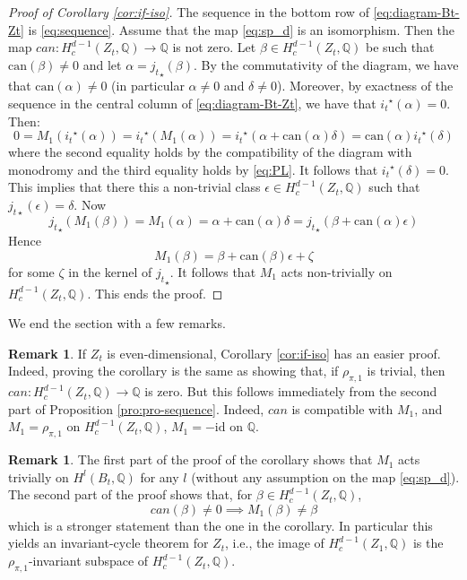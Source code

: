 \documentclass[11pt, reqno]{amsart}
\theoremstyle{plain}
\theoremstyle{definition}
\newtheorem{rem}[thm]{Remark}
\newcommand{\QQ}{\mathbb{Q}}
\begin{document}
\begin{proof}[Proof of Corollary \ref{cor:if-iso}]
The sequence in the bottom row of \eqref{eq:diagram-Bt-Zt} is \eqref{eq:sequence}. Assume that the map \eqref{eq:sp_d} is an isomorphism. Then
the map ${can} \colon H^{d-1}_c(Z_t, \QQ) \to \QQ $ is not zero. Let $\beta \in H^{d-1}_c(Z_t, \QQ)$ be such that $\mathrm{can}(\beta) \neq 0$ and let $\alpha={j_{t}}_{\star} (\beta)$.  By the commutativity of the diagram, we have that $\mathrm{can}(\alpha) \neq 0$ (in particular $\alpha \neq 0$ and $\delta \neq 0$). Moreover, by exactness of the sequence in the central column of \eqref{eq:diagram-Bt-Zt}, we have that ${i_{t}}^{\star} (\alpha)=0$.
Then: 
\[ 0= M_1({i_{t}}^{\star}  (\alpha))= {i_{t}}^{\star} (M_1(\alpha))={i_{t}}^{\star}  \left(\alpha + \mathrm{can}(\alpha) \delta\right)
=\mathrm{can}(\alpha) {i_{t}}^{\star} (\delta) 
\]
where the second equality holds by the compatibility of the diagram with monodromy and the third equality holds by \eqref{eq:PL}. It follows that ${i_{t}}^{\star}(\delta)=0$. This implies that there this a non-trivial class $\epsilon \in H^{d-1}_c(Z_t, \QQ)$ such that $j_{t \star}(\epsilon)=\delta$. Now
\[ {j_{t}}_{\star}(M_1(\beta))=M_1(\alpha)=\alpha + \mathrm{can}(\alpha)\delta= {j_{t}}_{\star}(\beta+\mathrm{can}(\alpha)\epsilon) \] 
Hence
\begin{equation}
\label{eq:Z-PL}
M_1(\beta)=\beta + \mathrm{can}(\beta) \epsilon +\zeta
\end{equation} for some $\zeta$ in the kernel of ${j_{t}}_{\star}$. It follows that $M_1$ acts non-trivially on $H^{d-1}_c(Z_t, \QQ)$. This ends the proof.
\end{proof}

We end the section with a few remarks.

\begin{rem}
\label{rem:even-proof}	
If $Z_t$ is even-dimensional, Corollary \ref{cor:if-iso} has an easier proof. Indeed,
proving the corollary is the same as showing that, if $\rho_{\pi,1}$ is trivial, then $can \colon H^{d-1}_c(Z_t, \QQ) \to \QQ$ is zero. But this follows immediately from the second part of Proposition \ref{pro:pro-sequence}. Indeed, $can$ is compatible with $M_1$, and $M_1=\rho_{\pi,1}$ on  $H^{d-1}_c(Z_t, \QQ)$,  $M_1 =- \mathrm{id}$ on $\QQ$.
\end{rem}

\begin{rem}
\label{rem:consequences}	
The first part of the proof of the corollary shows that $M_1$ acts trivially on $H^{l}(B_t, \QQ)$ for any $l$ (without any assumption on the map \eqref{eq:sp_d}). 
The second part of the proof shows that, for $\beta \in H^{d-1}_c(Z_t, \QQ)$, 
\[can(\beta)\neq 0 \implies M_1(\beta) \neq \beta\]
which is a stronger statement than the one in the corollary. 
In particular this yields an invariant-cycle theorem for $Z_t$, i.e., the image of  $H^{d-1}_c(Z_1, \QQ)$ is the $\rho_{\pi,1}$-invariant subspace of
$H^{d-1}_c(Z_t, \QQ)$.
\end{rem}
\end{document}
